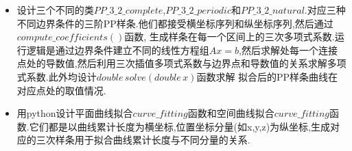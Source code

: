 \documentclass[a4paper]{article}
\begin{document}
\begin{itemize}
    \item 设计三个不同的类$PP\_3\_2\_complete$,$PP\_3\_2\_periodic$和$PP\_3\_2\_natural$.对应三种不同边界条件的三阶PP样条.他们都接受横坐标序列和纵坐标序列,然后通过$compute\_coefficients()$函数,
    生成样条在每一个区间上的三次多项式系数.运行逻辑是通过边界条件建立不同的线性方程组$Ax=b$,然后求解处每一个连接点处的导数值,然后利用三次插值多项式系数与边界点和导数值的关系求解多项式系数.此外均设计$double \, solve(double \, x)$函数求解
    拟合后的PP样条曲线在对应点处的取值情况.
    \item 用python设计平面曲线拟合$curve\_fitting$函数和空间曲线拟合$curve\_fitting$函数.它们都是以曲线累计长度为横坐标,位置坐标分量(如x,y,z)为纵坐标,生成对应的三次样条用于拟合曲线累计长度与不同分量的关系.
\end{itemize}
\end{document}
